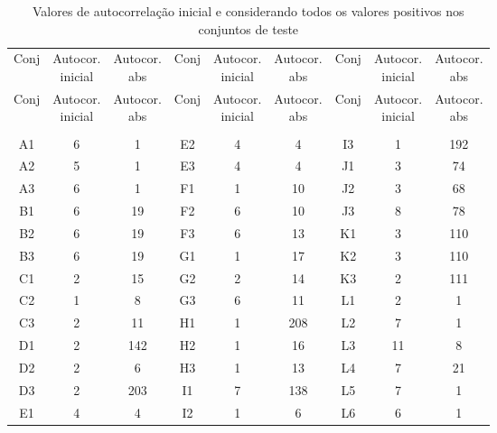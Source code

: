 \begin{center}
\begin{longtable}{ccc|ccc|ccc}
\toprule
\rowcolor{white}
\caption{Valores de autocorrelação inicial e considerando todos os valores
positivos nos conjuntos de teste} \label{tab:ValoresAutoRegressivosMet7}\\
\midrule
Conj & \specialcell{Autocor. \\inicial} & \specialcell{Autocor.
\\abs} & Conj & \specialcell{Autocor. \\inicial} & \specialcell{Autocor.
\\abs} & Conj & \specialcell{Autocor. \\inicial} & \specialcell{Autocor.
\\abs}\\
\midrule
\endfirsthead
\midrule
\rowcolor{white}
Conj & \specialcell{Autocor. \\inicial} & \specialcell{Autocor.
\\abs} & Conj & \specialcell{Autocor. \\inicial} & \specialcell{Autocor.
\\abs} & Conj & \specialcell{Autocor. \\inicial} & \specialcell{Autocor.
\\abs}\\
\toprule
\endhead
\midrule \\ %
\endfoot
\bottomrule
\endlastfoot
A1&6&1&E2&4&4&I3&1&192\\
A2&5&1&E3&4&4&J1&3&74\\
A3&6&1&F1&1&10&J2&3&68\\
B1&6&19&F2&6&10&J3&8&78\\
B2&6&19&F3&6&13&K1&3&110\\
B3&6&19&G1&1&17&K2&3&110\\
C1&2&15&G2&2&14&K3&2&111\\
C2&1&8&G3&6&11&L1&2&1\\
C3&2&11&H1&1&208&L2&7&1\\
D1&2&142&H2&1&16&L3&11&8\\
D2&2&6&H3&1&13&L4&7&21\\
D3&2&203&I1&7&138&L5&7&1\\
E1&4&4&I2&1&6&L6&6&1\\
\end{longtable}
\end{center}

